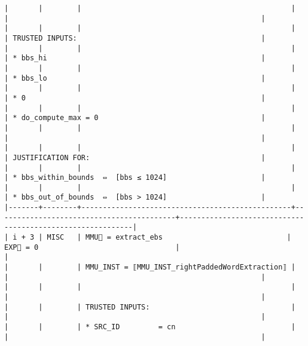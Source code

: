 \documentclass[varwidth=\maxdimen,margin=0.5cm,multi={verbatim}]{standalone}
\begin{document}
\begin{verbatim}
|       |        |                                                 |                                          |                                                           |
|       |        |                                                 |                                          | TRUSTED INPUTS:                                           |
|       |        |                                                 |                                          | * bbs_hi                                                  |
|       |        |                                                 |                                          | * bbs_lo                                                  |
|       |        |                                                 |                                          | * 0                                                       |
|       |        |                                                 |                                          | * do_compute_max = 0                                      |
|       |        |                                                 |                                          |                                                           |
|       |        |                                                 |                                          | JUSTIFICATION FOR:                                        |
|       |        |                                                 |                                          | * bbs_within_bounds  ⇔  [bbs ≤ 1024]                      |
|       |        |                                                 |                                          | * bbs_out_of_bounds  ⇔  [bbs > 1024]                      |
|-------+--------+-------------------------------------------------+------------------------------------------+-----------------------------------------------------------|
| i + 3 | MISC   | MMU🏴 = extract_ebs                             | EXP🏴 = 0                                |                                                           |
|       |        | MMU_INST = ⟦MMU_INST_rightPaddedWordExtraction⟧ |                                          |                                                           |
|       |        |                                                 |                                          |                                                           |
|       |        | TRUSTED INPUTS:                                 |                                          |                                                           |
|       |        | * SRC_ID         = cn                           |                                          |                                                           |

\end{verbatim}
\end{document}
